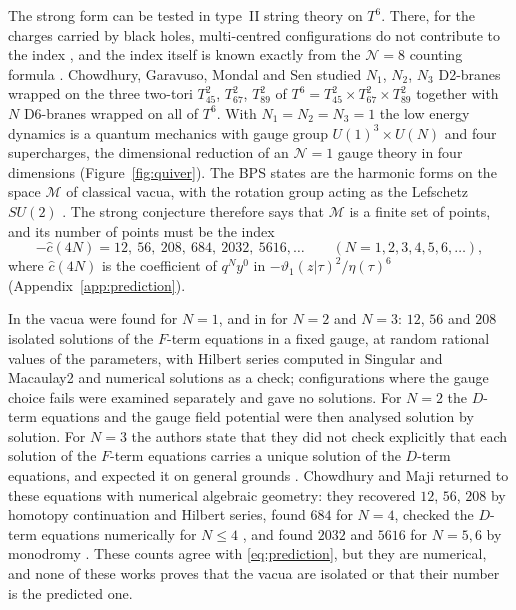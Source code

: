 \documentclass[11pt]{amsart}
\theoremstyle{definition}
\newcommand{\cM}{\mathcal M}
\begin{document}
The strong form can be tested in type~II string theory on $T^6$. There, for the charges carried by black holes, multi-centred configurations do not contribute to the index \cite{Sen08b}, and the index itself is known exactly from the $\mathcal N=8$ counting formula \cite{SSY06,Sen10}. Chowdhury, Garavuso, Mondal and Sen studied $N_1$, $N_2$, $N_3$ D2-branes wrapped on the three two-tori $T^2_{45}$, $T^2_{67}$, $T^2_{89}$ of $T^6=T^2_{45}\times T^2_{67}\times T^2_{89}$ together with $N$ D6-branes wrapped on all of $T^6$. With $N_1=N_2=N_3=1$ the low energy dynamics is a quantum mechanics with gauge group $U(1)^3\times U(N)$ and four supercharges, the dimensional reduction of an $\mathcal N=1$ gauge theory in four dimensions (Figure~\ref{fig:quiver}). The BPS states are the harmonic forms on the space $\cM$ of classical vacua, with the rotation group acting as the Lefschetz $SU(2)$ \cite{Wit82,Den02,BBdBES12}. The strong conjecture therefore says that $\cM$ is a finite set of points, and its number of points must be the index
\begin{equation}\label{eq:prediction}
-\hat c(4N)=12,\ 56,\ 208,\ 684,\ 2032,\ 5616,\ldots\qquad(N=1,2,3,4,5,6,\ldots),
\end{equation}
where $\hat c(4N)$ is the coefficient of $q^Ny^0$ in $-\vartheta_1(z|\tau)^2/\eta(\tau)^6$ (Appendix~\ref{app:prediction}).

In \cite{CGMS14} the vacua were found for $N=1$, and in \cite{CGMS16} for $N=2$ and $N=3$: $12$, $56$ and $208$ isolated solutions of the $F$-term equations in a fixed gauge, at random rational values of the parameters, with Hilbert series computed in Singular and Macaulay2 and numerical solutions as a check; configurations where the gauge choice fails were examined separately and gave no solutions. For $N=2$ the $D$-term equations and the gauge field potential were then analysed solution by solution. For $N=3$ the authors state that they did not check explicitly that each solution of the $F$-term equations carries a unique solution of the $D$-term equations, and expected it on general grounds \cite[Section~5]{CGMS16}. Chowdhury and Maji returned to these equations with numerical algebraic geometry: they recovered $12$, $56$, $208$ by homotopy continuation and Hilbert series, found $684$ for $N=4$, checked the $D$-term equations numerically for $N\le4$ \cite{CM24}, and found $2032$ and $5616$ for $N=5,6$ by monodromy \cite{CM26}. These counts agree with \eqref{eq:prediction}, but they are numerical, and none of these works proves that the vacua are isolated or that their number is the predicted one.
\end{document}
